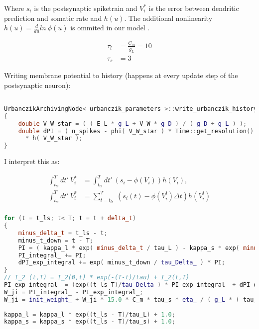 Where $s_i$ is the postsynaptic spiketrain and $V_i^*$ is the error between dendritic prediction and somatic rate and
$h( u )$. The additional nonlinearity $h( u ) = \frac{d}{du} ln \  \phi(u)$ is ommited in our model .



\begin{align}
  \tau_l & = \frac{C_m}{g_L} = 10 \\
  \tau_s & = 3
\end{align}

Writing membrane potential to history (happens at every update step of the postsynaptic neuron):

\begin{lstlisting}[language=C++, directivestyle={\color{black}}
                   emph={int,char,double,float,unsigned,exp},
                   emphstyle={\color{blue}}]

UrbanczikArchivingNode< urbanczik_parameters >::write_urbanczik_history(Time t, double V_W, int n_spikes, int comp)
{
	double V_W_star = ( ( E_L * g_L + V_W * g_D ) / ( g_D + g_L ) );
	double dPI = ( n_spikes - phi( V_W_star ) * Time::get_resolution().get_ms() )
      * h( V_W_star );
}\end{lstlisting}

I interpret this as:


\begin{align}
  \int_{t_{ls}}^T dt' \ V_i^* & = \int_{t_{ls}}^T dt' \  (s_i - \phi(V_i )) h(V_i),               \\
  \int_{t_{ls}}^T dt' \ V_i^* & = \sum_{t=t_{ls}}^T \  (s_i(t) -  \phi(V_i^t ) \Delta t) h(V_i^t) \\
\end{align}

\begin{lstlisting}[language=C++, directivestyle={\color{black}}
                   emph={int,char,double,float,unsigned,exp},
                   emphstyle={\color{blue}}]
for (t = t_ls; t< T; t = t + delta_t)
{
   	minus_delta_t = t_ls - t;
    minus_t_down = t - T;
    PI = ( kappa_l * exp( minus_delta_t / tau_L ) - kappa_s * exp( minus_delta_t / tau_s ) ) * V_star(t);
    PI_integral_ += PI;
    dPI_exp_integral += exp( minus_t_down / tau_Delta_ ) * PI;
}  
// I_2 (t,T) = I_2(0,t) * exp(-(T-t)/tau) + I_2(t,T)
PI_exp_integral_ = (exp((t_ls-T)/tau_Delta_) * PI_exp_integral_ + dPI_exp_integral);
W_ji = PI_integral_ - PI_exp_integral_;
W_ji = init_weight_ + W_ji * 15.0 * C_m * tau_s * eta_ / ( g_L * ( tau_L - tau_s ) );    
  
kappa_l = kappa_l * exp((t_ls - T)/tau_L) + 1.0;
kappa_s = kappa_s * exp((t_ls - T)/tau_s) + 1.0;
  \end{lstlisting}


